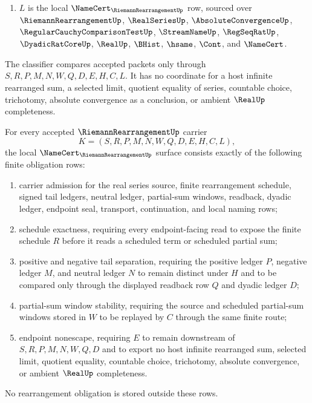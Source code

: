 \begin{definition}
\begin{enumerate}
$$
S,R,P,M,N,W,Q,D \longmapsto E .
$$
\item $L$ is the local $\NameCert_{\RiemannRearrangementUp}$ row, sourced over $\RiemannRearrangementUp$, $\RealSeriesUp$, $\AbsoluteConvergenceUp$, $\RegularCauchyComparisonTestUp$, $\StreamNameUp$, $\RegSeqRatUp$, $\DyadicRatCoreUp$, $\RealUp$, $\BHist$, $\hsame$, $\Cont$, and $\NameCert$.
\end{enumerate}
The classifier compares accepted packets only through $S,R,P,M,N,W,Q,D,E,H,C,L$. It has no coordinate for a host infinite rearranged sum, a selected limit, quotient equality of series, countable choice, trichotomy, absolute convergence as a conclusion, or ambient $\RealUp$ completeness.
\end{definition}

\begin{theorem}\label{thm:riemann-rearrangement-namecert-obligations}
For every accepted $\RiemannRearrangementUp$ carrier
$$
K=(S,R,P,M,N,W,Q,D,E,H,C,L),
$$
the local $\NameCert_{\RiemannRearrangementUp}$ surface consists exactly of the following finite obligation rows:
\begin{enumerate}
\item carrier admission for the real series source, finite rearrangement schedule, signed tail ledgers, neutral ledger, partial-sum windows, readback, dyadic ledger, endpoint seal, transport, continuation, and local naming rows;
\item schedule exactness, requiring every endpoint-facing read to expose the finite schedule $R$ before it reads a scheduled term or scheduled partial sum;
\item positive and negative tail separation, requiring the positive ledger $P$, negative ledger $M$, and neutral ledger $N$ to remain distinct under $H$ and to be compared only through the displayed readback row $Q$ and dyadic ledger $D$;
\item partial-sum window stability, requiring the source and scheduled partial-sum windows stored in $W$ to be replayed by $C$ through the same finite route;
\item endpoint nonescape, requiring $E$ to remain downstream of $S,R,P,M,N,W,Q,D$ and to export no host infinite rearranged sum, selected limit, quotient equality, countable choice, trichotomy, absolute convergence, or ambient $\RealUp$ completeness.
\end{enumerate}
No rearrangement obligation is stored outside these rows.
\end{theorem}


